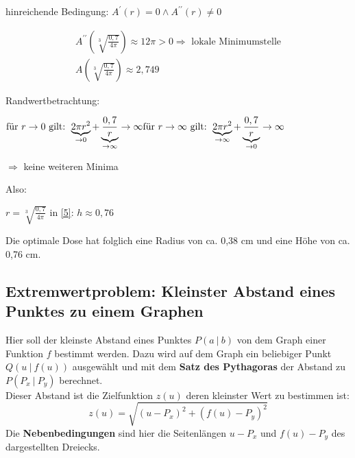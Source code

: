 hinreichende Bedingung: $A^\prime(r) = 0 \land A^{\prime\prime}(r) \neq 0$

\begin{equation*}
    \begin{gathered}
        A^{\prime\prime}\left(\sqrt[3]{\frac{0,7}{4\pi}}\right) \approx 12\pi > 0 \Rightarrow \text{ lokale Minimumstelle} \\
        A\left(\sqrt[3]{\frac{0,7}{4\pi}}\right) \approx 2,749
    \end{gathered}
\end{equation*}

Randwertbetrachtung: 

$\text{für }  r \to 0  \text{ gilt: }  \underbrace{2\pi r^2}_{\to 0} + \underbrace{\frac{0,7}{r}}_{\to \infty} \to \infty \\
\text{für }  r \to \infty \text{ gilt: }  \underbrace{2\pi r^2}_{\to \infty} + \underbrace{\frac{0,7}{r}}_{\to 0} \to \infty$

$\Rightarrow$ keine weiteren Minima

Also: 

$r = \sqrt[3]{\frac{0,7}{4\pi}}$ in \eqref{5}: $ h \approx 0, 76 $

Die \glqq optimale\grqq{} Dose hat folglich eine Radius von ca. 0,38 cm und eine Höhe von ca. 0,76 cm.

\subsection{Extremwertproblem: Kleinster Abstand eines Punktes zu einem Graphen}

Hier soll der kleinste Abstand eines Punktes $P(a \ |  \ b)$ von dem Graph einer Funktion $f$ bestimmt werden. Dazu wird auf dem Graph ein beliebiger Punkt $Q(u \ | \ f(u))$ ausgewählt und mit dem \textbf{Satz des Pythagoras} der Abstand zu $P(P_x \ |  \ P_y)$ berechnet.\\
Dieser Abstand ist die Zielfunktion $z(u)$ deren kleinster Wert zu bestimmen ist:
$$z(u) = \sqrt{(u-P_x)^2 + (f(u)-P_y)^2}$$
Die \textbf{Nebenbedingungen} sind hier die Seitenlängen $u - P_x$ und $f(u) - P_y$ des dargestellten Dreiecks.

